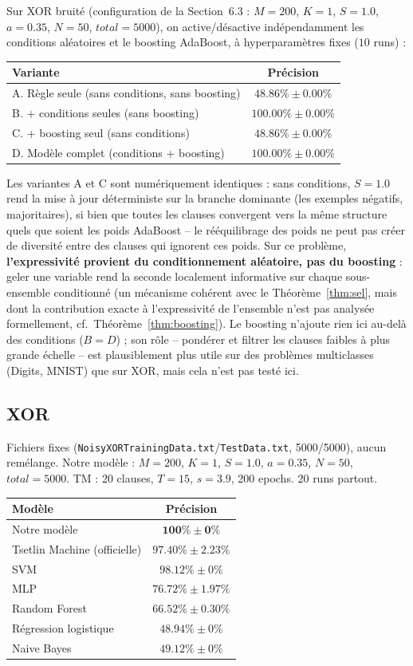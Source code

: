 \documentclass[12pt,a4paper]{article}
\begin{document}
Sur XOR bruité (configuration de la Section~6.3 : $M{=}200$, $K{=}1$,
$S{=}1.0$, $a{=}0.35$, $N{=}50$, $total{=}5000$), on active/désactive
indépendamment les conditions aléatoires et le boosting AdaBoost, à
hyperparamètres fixes ($10$ runs) :
\begin{center}
\begin{tabular}{lc}
\toprule
Variante & Précision \\
\midrule
A. Règle seule (sans conditions, sans boosting) & $48.86\%\pm0.00\%$ \\
B. + conditions seules (sans boosting) & $\mathbf{100.00\%\pm0.00\%}$ \\
C. + boosting seul (sans conditions) & $48.86\%\pm0.00\%$ \\
D. Modèle complet (conditions + boosting) & $\mathbf{100.00\%\pm0.00\%}$ \\
\bottomrule
\end{tabular}
\end{center}
Les variantes A et C sont numériquement identiques : sans conditions,
$S{=}1.0$ rend la mise à jour déterministe sur la branche dominante (les
exemples négatifs, majoritaires), si bien que toutes les clauses convergent
vers la même structure quels que soient les poids AdaBoost -- le
rééquilibrage des poids ne peut pas créer de diversité entre des clauses
qui ignorent ces poids. Sur ce problème, \textbf{l'expressivité provient
du conditionnement aléatoire, pas du boosting} : geler une variable rend
la seconde localement informative sur chaque sous-ensemble conditionné (un
mécanisme cohérent avec le Théorème~\ref{thm:sel}, mais dont la
contribution exacte à l'expressivité de l'ensemble n'est pas analysée
formellement, cf.\ Théorème~\ref{thm:boosting}). Le boosting n'ajoute rien
ici au-delà des conditions ($B=D$) ; son rôle -- pondérer et filtrer les
clauses faibles à plus grande échelle -- est plausiblement plus utile sur
des problèmes multiclasses (Digits, MNIST) que sur XOR, mais cela n'est pas
testé ici.

\subsection{XOR}
Fichiers fixes (\texttt{NoisyXORTrainingData.txt}/\texttt{TestData.txt},
5000/5000), aucun remélange. Notre modèle : $M{=}200$, $K{=}1$, $S{=}1.0$,
$a{=}0.35$, $N{=}50$, $total{=}5000$. TM : 20 clauses, $T{=}15$, $s{=}3.9$,
200 epochs. 20 runs partout.
\begin{center}
\begin{tabular}{lc}
\toprule
Modèle & Précision \\
\midrule
Notre modèle & $\mathbf{100\%\pm0\%}$ \\
Tsetlin Machine (officielle) & $97.40\%\pm2.23\%$ \\
SVM & $98.12\%\pm0\%$ \\
MLP & $76.72\%\pm1.97\%$ \\
Random Forest & $66.52\%\pm0.30\%$ \\
Régression logistique & $48.94\%\pm0\%$ \\
Naive Bayes & $49.12\%\pm0\%$ \\
\bottomrule
\end{tabular}
\end{center}
\end{document}
